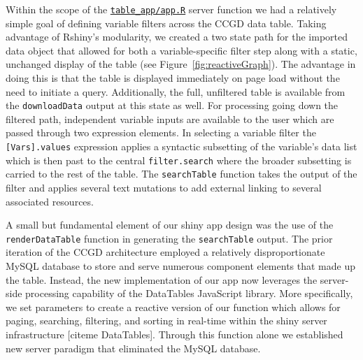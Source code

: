 \documentclass[10pt]{report}
\begin{document}
Within the scope of the \href{https://github.com/ctastad/ccgd/blob/master/table_app/app.R}{\texttt{table\_app/app.R}} server function we had a relatively simple goal of defining variable filters across the CCGD data table. Taking advantage of Rshiny's modularity, we created a two state path for the imported data object that allowed for both a variable-specific filter step along with a static, unchanged display of the table (see Figure~\ref{fig:reactiveGraph}). The advantage in doing this is that the table is displayed immediately on page load without the need to initiate a query. Additionally, the full, unfiltered table is available from the \texttt{downloadData} output at this state as well. For processing going down the filtered path, independent variable inputs are available to the user which are passed through two expression elements. In selecting a variable filter the \texttt{[Vars].values} expression applies a syntactic subsetting of the variable's data list which is then past to the central \texttt{filter.search} where the broader subsetting is carried to the rest of the table. The \texttt{searchTable} function takes the output of the filter and applies several text mutations to add external linking to several associated resources.

A small but fundamental element of our shiny app design was the use of the \texttt{renderDataTable} function in generating the \texttt{searchTable} output. The prior iteration of the CCGD architecture employed a relatively disproportionate MySQL database to store and serve numerous component elements that made up the table. Instead, the new implementation of our app now leverages the server-side processing capability of the DataTables JavaScript library. More specifically, we set parameters to create a reactive version of our function which allows for paging, searching, filtering, and sorting in real-time within the shiny server infrastructure [citeme DataTables]. Through this function alone we established new server paradigm that eliminated the MySQL database.
\end{document}
